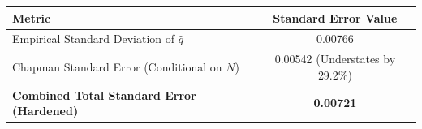 \begin{tabular}{lc}
\hline
\textbf{Metric} & \textbf{Standard Error Value} \\
\hline
Empirical Standard Deviation of $\hat{q}$ & 0.00766 \\
Chapman Standard Error (Conditional on $N$) & 0.00542 (Understates by 29.2\%) \\
\textbf{Combined Total Standard Error (Hardened)} & \textbf{0.00721} \\
\hline
\end{tabular}
